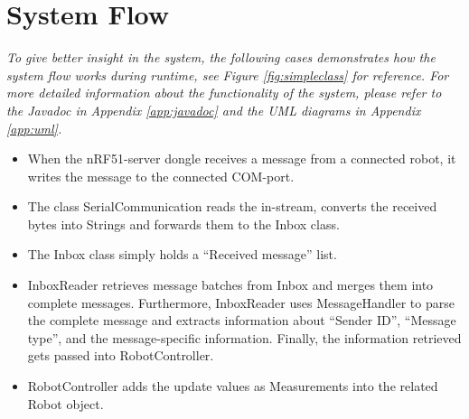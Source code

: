 \newpage
\section{System Flow}
\label{secr:systemflow}
\textit{To give better insight in the system, the following cases demonstrates how the system flow works during runtime, see Figure \ref{fig:simpleclass} for reference. For more detailed information about the functionality of the system, please refer to the  Javadoc in Appendix \ref{app:javadoc} and the UML diagrams in Appendix \ref{app:uml}.}

\begin{itemize}
    \item When the nRF51-server dongle receives a message from a connected robot, it writes the message to the connected COM-port.
    \item The class SerialCommunication reads the in-stream, converts the received bytes into Strings and forwards them to the Inbox class.
    \item The Inbox class simply holds a ``Received message'' list.
    \item InboxReader retrieves message batches from Inbox and merges them into complete messages. Furthermore, InboxReader uses MessageHandler to parse the complete message and extracts information about ``Sender ID'', ``Message type'', and the message-specific information. Finally, the information retrieved gets passed into RobotController.
    \item RobotController adds the update values as Measurements into the related Robot object.
\end{itemize}

